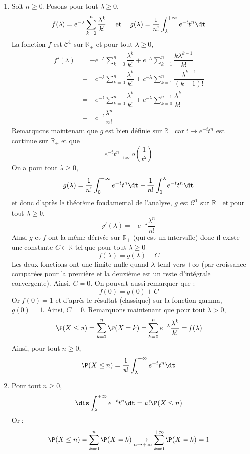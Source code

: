 \documentclass[a4paper,10pt]{report}
\begin{document}
\begin{enumerate}
\item Soit $n \geq 0$. Posons pour tout $\lambda  \geq 0$,
$$ f(\lambda) = e^{- \lambda} \sum_{k=0}^n  \dfrac{\lambda^k}{k!} \quad \hbox{ et } \quad g(\lambda) = \dfrac{1}{n!} \int_{\lambda}^{+ \infty} e^{-t} t^n \dt$$
La fonction $f$ est $\mathcal{C}^1$ sur $\mathbb{R}_+$ et pour tout $\lambda \geq 0$,
\begin{align*}
f'(\lambda) & = - e^{-\lambda} \sum_{k=0}^n  \dfrac{\lambda^k}{k!} + e^{-\lambda} \sum_{k=1}^n  \dfrac{k\lambda^{k-1}}{k!} \\
& = -e^{-\lambda} \sum_{k=0}^n  \dfrac{\lambda^k}{k!} + e^{-\lambda} \sum_{k=1}^n  \dfrac{\lambda^{k-1}}{(k-1)!} \\
& = -e^{-\lambda} \sum_{k=0}^n  \dfrac{\lambda^k}{k!} + e^{-\lambda} \sum_{k=0}^{n-1} \dfrac{\lambda^{k}}{k!} \\
& = -e^{-\lambda} \dfrac{\lambda^n}{n!}
\end{align*}
Remarquons maintenant que $g$ est bien définie sur $\mathbb{R}_+$ car $t \mapsto e^{-t}t^n$ est continue sur $\mathbb{R}_+$ et que :
$$ e^{-t} t^n \underset{+ \infty}{=}o \left( \dfrac{1}{t^2} \right)$$
On a pour tout $\lambda \geq 0$,
$$ g(\lambda) =\dfrac{1}{n!} \int_{0}^{+ \infty} e^{-t} t^n \dt - \dfrac{1}{n!} \int_{0}^{\lambda} e^{-t} t^n \dt$$
et donc d'après le théorème fondamental de l'analyse, $g$ est $\mathcal{C}^1$ sur $\mathbb{R}_+$ et pour tout $\lambda \geq 0$,
$$ g'(\lambda) = -e^{-\lambda} \dfrac{\lambda^n}{n!}$$
Ainsi $g$ et $f$ ont la même dérivée sur $\mathbb{R}_+$ (qui est un intervalle) donc il existe une constante $C \in \mathbb{R}$ tel que pour tout $\lambda \geq 0$,
$$ f(\lambda) = g(\lambda) + C$$
Les deux fonctions ont une limite nulle quand $\lambda$ tend vers $+ \infty$ (par croissance comparées pour la première et la deuxième est un reste d'intégrale  convergente). Ainsi, $C=0$. On pouvait aussi remarquer que :
$$ f(0) = g(0) + C$$
Or $f(0)=1$ et d'après le résultat (classique) sur la fonction gamma, $g(0)=1$. Ainsi, $C=0$. Remarquons maintenant que pour tout $\lambda>0$,
$$ \P(X \leq n) = \sum_{k=0}^n \P(X=k) = \sum_{k=0}^n e^{-\lambda} \dfrac{\lambda^k}{k!} = f(\lambda)$$
Ainsi, pour tout $n \geq 0$,
$$ \P(X \leq n) = \dfrac{1}{n!} \int_{\lambda}^{+ \infty} e^{-t} t^n \dt$$
\item Pour tout $n \geq 0$,
$$ \dis \int_{\lambda}^{+ \infty} e^{-t} t^n \dt = n! \P(X \leq n)$$
Or :
$$ \P(X \leq n) = \sum_{k=0}^n \P(X=k) \underset{n \rightarrow + \infty}{\longrightarrow} \sum_{k=0}^{+ \infty} \P(X=k) = 1$$

\end{enumerate}
\end{document}
